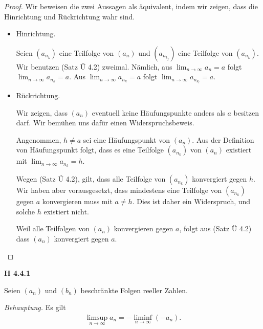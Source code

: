 \documentclass[12pt]{extarticle}
\begin{document}
\begin{proof}
  Wir beweisen die zwei Aussagen als äquivalent, indem wir zeigen,
  dass die Hinrichtung und Rückrichtung wahr sind.

  \begin{itemize}
  \item Hinrichtung.

    Seien \((a_{n_k})\) eine Teilfolge von \((a_n)\) und \((a_{n_{k_j}})\)
    eine Teilfolge von \((a_{n_k})\).  Wir benutzen (Satz Ü 4.2)
    zweimal.  Nämlich, aus \(\lim_{n\rightarrow\infty}{a_n} = a\) folgt
    \(\lim_{n\rightarrow\infty}{a_{n_k}} = a\).  Aus
    \(\lim_{n\rightarrow\infty}{a_{n_k}} = a\) folgt
    \(\lim_{n\rightarrow\infty}{a_{n_{k_l}}} = a\).
  \item Rückrichtung.

    Wir zeigen, dass \((a_n)\) eventuell keine Häufungspunkte anders als
    \(a\) besitzen darf.  Wir bemühen uns dafür einen
    Widerspruchsbeweis.

    Angenommen, \(h \neq a\) sei eine Häufungspunkt von \((a_n)\).  Aus
    der Definition von Häufungspunkt folgt, dass es eine Teilfolge
    \((a_{n_k})\) von \((a_n)\) existiert mit
    \(\lim_{n\rightarrow\infty}{a_{n_k}}=h\).

    Wegen (Satz Ü 4.2), gilt, dass alle Teilfolge von \((a_{n_k})\)
    konvergiert gegen \(h\).  Wir haben aber vorausgesetzt, dass
    mindestens eine Teilfolge von \((a_{n_k})\) gegen \(a\) konvergieren
    muss mit \(a \neq h\).  Dies ist daher ein Widerspruch, und solche
    \(h\) existiert nicht.

    Weil alle Teilfolgen von  \((a_n)\) konvergieren gegen \(a\), folgt
    aus (Satz Ü 4.2) dass \((a_n)\) konvergiert gegen \(a\).
  \end{itemize}
\end{proof}

\textbf{H 4.4.1}

Seien \((a_n)\) und \((b_n)\) beschränkte Folgen reeller Zahlen.

\textit{Behauptung.}  Es gilt
\begin{align*}
\limsup_{n\rightarrow\infty}{a_n} = -\liminf_{n\rightarrow\infty}{(-a_n)}.
\end{align*}
\end{document}
